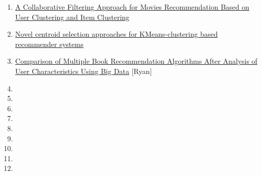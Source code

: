 \begin{enumerate}[label=(\arabic*)]
    \item \cite{jagadev2018collaborative} \href{https://link.springer.com/chapter/10.1007/978-981-13-1813-9_19}{A Collaborative Filtering Approach for Movies Recommendation Based on User Clustering and Item Clustering}
    \item \cite{zahra2015novel} \href{https://galileo-gatech.primo.exlibrisgroup.com/discovery/fulldisplay?docid=cdi_proquest_miscellaneous_1778050040&context=PC&vid=01GALI_GIT:GT&lang=en&search_scope=CentralIndex&adaptor=Primo%20Central&tab=CentralIndex&query=any,contains,book%20recommendation%20clustering&offset=0}{Novel centroid selection approaches for KMeans-clustering based recommender systems}
    \item \cite{wang2023comparison} \href{https://www.tandfonline.com/doi/pdf/10.1080/07317131.2023.2259691?needAccess=true}{Comparison of Multiple Book Recommendation Algorithms After Analysis of User Characteristics Using Big Data} [Ryan]
    \item 
    \item 
    \item 
    \item 
    \item 
    \item 
    \item 
    \item 
    \item 
\end{enumerate}